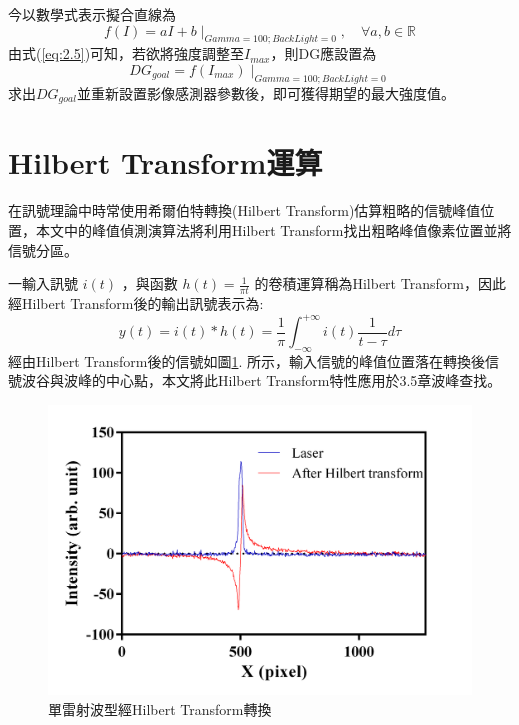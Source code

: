 今以數學式表示擬合直線為
\begin{equation}\label{eq:2.5}
	f(I) = aI+b\mid_{Gamma=100;BackLight=0}, \quad \forall a,b \in \mathbf{\mathbb{R}}
\end{equation}
由式(\ref{eq:2.5})可知，若欲將強度調整至$I_{max}$，則DG應設置為
\begin{equation}\label{eq:2.6}
	DG_{goal} = f(I_{max})\mid_{Gamma=100;BackLight=0}
\end{equation}
求出$DG_{goal}$並重新設置影像感測器參數後，即可獲得期望的最大強度值。
\section{Hilbert Transform運算}
在訊號理論中時常使用希爾伯特轉換(Hilbert Transform)\cite{Hilbert_book}估算粗略的信號峰值位置，本文中的峰值偵測演算法將利用Hilbert Transform找出粗略峰值像素位置並將信號分區。\par
一輸入訊號
\begin {math}
i(t) 
\end{math}
，與函數
\begin {math}
h(t) = \frac{1}{\pi t}
\end{math}
的卷積運算稱為Hilbert Transform，因此經Hilbert Transform後的輸出訊號表示為:
\begin{equation}\label{eq:2.7}
	y(t)=i(t)\ast h(t) = \frac{1}{\pi}\int_{-\infty}^{+\infty}i(t)\frac{1}{t-\tau}d\tau
\end{equation}
經由Hilbert Transform後的信號如圖\ref{單雷射波型經希爾伯特轉換}. 所示，輸入信號的峰值位置落在轉換後信號波谷與波峰的中心點，本文將此Hilbert Transform特性應用於3.5章波峰查找。
\begin{figure}[H] %
	\centering %
	\vspace{10pt}
	\setlength{\abovecaptionskip}{0.cm}
	\includegraphics[width=16cm]{figures/p2-3_V2.png} %
	\caption{單雷射波型經Hilbert Transform轉換} %
	\label{單雷射波型經希爾伯特轉換} %
\end{figure}

